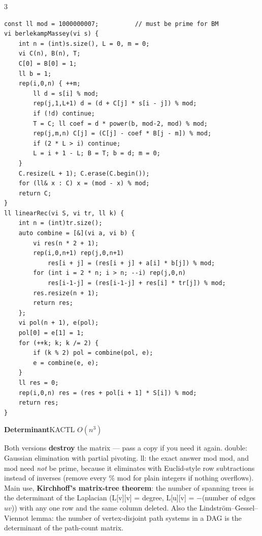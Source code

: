 \documentclass[9pt,a4paper]{extarticle}
\newcommand{\entry}[3]{%
  \addcontentsline{toc}{subsection}{#1}%
  \vspace{0.8ex}%
  \noindent\colorbox{hdbg}{\parbox{\dimexpr\columnwidth-2\fboxsep}{%
    \strut\textbf{#1}\hfill{\footnotesize\textsf{#2}}}}\par
  \vspace{0.4ex}%
  {\footnotesize #3\par}%
}
\newcommand{\code}[1]{{\ttfamily\small #1}}
\begin{document}
\begin{multicols*}{3}
\begin{lstlisting}
const ll mod = 1000000007;          // must be prime for BM
vi berlekampMassey(vi s) {
    int n = (int)s.size(), L = 0, m = 0;
    vi C(n), B(n), T;
    C[0] = B[0] = 1;
    ll b = 1;
    rep(i,0,n) { ++m;
        ll d = s[i] % mod;
        rep(j,1,L+1) d = (d + C[j] * s[i - j]) % mod;
        if (!d) continue;
        T = C; ll coef = d * power(b, mod-2, mod) % mod;
        rep(j,m,n) C[j] = (C[j] - coef * B[j - m]) % mod;
        if (2 * L > i) continue;
        L = i + 1 - L; B = T; b = d; m = 0;
    }
    C.resize(L + 1); C.erase(C.begin());
    for (ll& x : C) x = (mod - x) % mod;
    return C;
}
ll linearRec(vi S, vi tr, ll k) {
    int n = (int)tr.size();
    auto combine = [&](vi a, vi b) {
        vi res(n * 2 + 1);
        rep(i,0,n+1) rep(j,0,n+1)
            res[i + j] = (res[i + j] + a[i] * b[j]) % mod;
        for (int i = 2 * n; i > n; --i) rep(j,0,n)
            res[i-1-j] = (res[i-1-j] + res[i] * tr[j]) % mod;
        res.resize(n + 1);
        return res;
    };
    vi pol(n + 1), e(pol);
    pol[0] = e[1] = 1;
    for (++k; k; k /= 2) {
        if (k % 2) pol = combine(pol, e);
        e = combine(e, e);
    }
    ll res = 0;
    rep(i,0,n) res = (res + pol[i + 1] * S[i]) % mod;
    return res;
}
\end{lstlisting}

\entry{Determinant}{KACTL \quad $O(n^3)$}{%
Both versions \textbf{destroy} the matrix --- pass a copy if you need it again.
\code{double}: Gaussian elimination with partial pivoting. \code{ll}: the exact answer
mod \code{mod}, and \code{mod} need \emph{not} be prime, because it eliminates with
Euclid-style row subtractions instead of inverses (remove every \code{\% mod} for plain
integers if nothing overflows).\\[0.3ex]
Main use, \textbf{Kirchhoff's matrix-tree theorem}: the number of spanning trees is the
determinant of the Laplacian (\code{L[v][v]} = degree, \code{L[u][v]} = $-$(number of
edges $uv$)) with any one row and the same column deleted. Also the
Lindstr\"om--Gessel--Viennot lemma: the number of vertex-disjoint path systems in a DAG
is the determinant of the path-count matrix.}


\end{multicols*}
\end{document}

